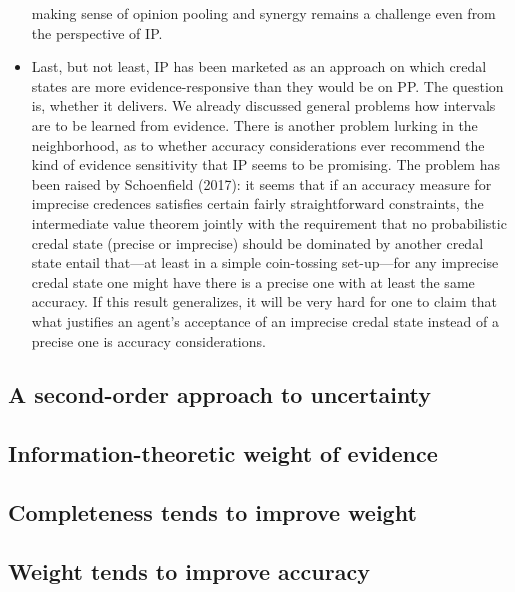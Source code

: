 \documentclass[
  10pt,
  dvipsnames,enabledeprecatedfontcommands]{scrartcl}
\begin{document}
\begin{itemize}
  making sense of opinion pooling and synergy remains a challenge even
  from the perspective of \textsf{IP}.
\item
  Last, but not least, \textsf{IP} has been marketed as an approach on
  which credal states are more evidence-responsive than they would be on
  \textsf{PP}. The question is, whether it delivers. We already
  discussed general problems how intervals are to be learned from
  evidence. There is another problem lurking in the neighborhood, as to
  whether accuracy considerations ever recommend the kind of evidence
  sensitivity that \textsf{IP} seems to be promising. The problem has
  been raised by Schoenfield (2017): it seems that if an accuracy
  measure for imprecise credences satisfies certain fairly
  straightforward constraints, the intermediate value theorem jointly
  with the requirement that no probabilistic credal state (precise or
  imprecise) should be dominated by another credal state entail
  that---at least in a simple coin-tossing set-up---for any imprecise
  credal state one might have there is a precise one with at least the
  same accuracy. If this result generalizes, it will be very hard for
  one to claim that what justifies an agent's acceptance of an imprecise
  credal state instead of a precise one is accuracy considerations.
\end{itemize}

\hypertarget{a-second-order-approach-to-uncertainty}{%
\subsection{A second-order approach to
uncertainty}\label{a-second-order-approach-to-uncertainty}}

\hypertarget{information-theoretic-weight-of-evidence}{%
\subsection{Information-theoretic weight of
evidence}\label{information-theoretic-weight-of-evidence}}

\hypertarget{completeness-tends-to-improve-weight}{%
\subsection{Completeness tends to improve
weight}\label{completeness-tends-to-improve-weight}}

\hypertarget{weight-tends-to-improve-accuracy}{%
\subsection{Weight tends to improve
accuracy}\label{weight-tends-to-improve-accuracy}}
\end{document}
